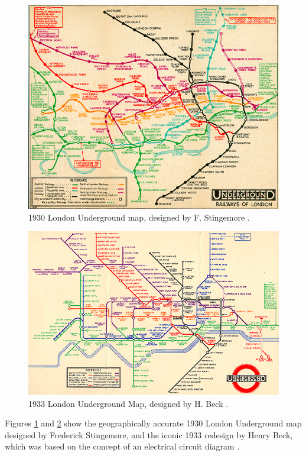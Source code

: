 \begin{figure}[hp!]
	\centering
	\includegraphics[width=.9\textwidth]{img/lit-survey/1930-pre-beck.png}
	\caption{1930 London Underground map, designed by F. Stingemore \citep{Tube150}.}
	\label{fig:pre-beck}
\end{figure}

\begin{figure}[hp!]
	\centering
	\includegraphics[width=.9\textwidth]{img/lit-survey/1933-beck.png}
	\caption{1933 London Underground Map, designed by H. Beck \citep{Tube150}.}
	\label{fig:beck}
\end{figure}

Figures \ref{fig:pre-beck} and \ref{fig:beck} show the geographically accurate 1930 London Underground map designed by Frederick Stingemore, and the iconic 1933 redesign by Henry Beck, which was based on the concept of an electrical circuit diagram \citep{HarryBeck}.

